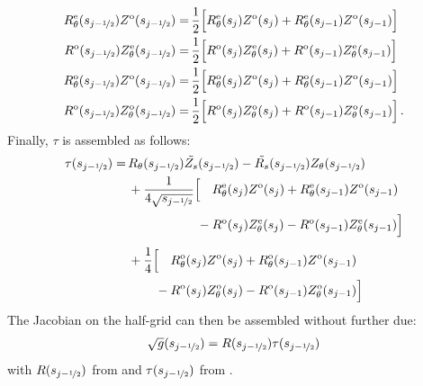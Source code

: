 \begin{align}
  R_\theta^\mathrm{e}(s_{j-\nicefrac{1}{2}}) Z^\mathrm{o}(s_{j-\nicefrac{1}{2}}) =&\, \frac{1}{2} \Bigl[ R_\theta^\mathrm{e}(s_{j}) Z^\mathrm{o}(s_{j}) + R_\theta^\mathrm{e}(s_{j-1}) Z^\mathrm{o}(s_{j-1}) \Bigr] \\
  R^\mathrm{o}(s_{j-\nicefrac{1}{2}}) Z_\theta^\mathrm{e}(s_{j-\nicefrac{1}{2}}) =&\, \frac{1}{2} \Bigl[ R^\mathrm{o}(s_{j}) Z_\theta^\mathrm{e}(s_{j}) + R^\mathrm{o}(s_{j-1}) Z_\theta^\mathrm{e}(s_{j-1}) \Bigr] \\
  R_\theta^\mathrm{o}(s_{j-\nicefrac{1}{2}}) Z^\mathrm{o}(s_{j-\nicefrac{1}{2}}) =&\, \frac{1}{2} \Bigl[ R_\theta^\mathrm{o}(s_{j}) Z^\mathrm{o}(s_{j}) + R_\theta^\mathrm{o}(s_{j-1}) Z^\mathrm{o}(s_{j-1}) \Bigr] \\
  R^\mathrm{o}(s_{j-\nicefrac{1}{2}}) Z_\theta^\mathrm{o}(s_{j-\nicefrac{1}{2}}) =&\, \frac{1}{2} \Bigl[ R^\mathrm{o}(s_{j}) Z_\theta^\mathrm{o}(s_{j}) + R^\mathrm{o}(s_{j-1}) Z_\theta^\mathrm{o}(s_{j-1}) \Bigr] \, .
\end{align}
Finally, $\tau$ is assembled as follows:
\begin{align}
  \tau(s_{j-\half}) =&\,   R_\theta(s_{j-\half}) {\tilde{Z_s}}(s_{j-\half}) - {\tilde{R_s}}(s_{j-\half}) Z_\theta(s_{j-\half}) \nonumber \\
                    ~&\, + \frac{1}{4 \sqrt{s_{j-\half}}} \Bigl[ \phantom{-}\, R_\theta^\mathrm{e}(s_{j}) Z^\mathrm{o}(s_{j}) + R_\theta^\mathrm{e}(s_{j-1}) Z^\mathrm{o}(s_{j-1}) \nonumber \\
           ~&\, \phantom{+ \frac{1}{4 \sqrt{s_{j-\half}}} \Bigl[}\,       -    R^\mathrm{o}(s_{j}) Z_\theta^\mathrm{e}(s_{j}) - R^\mathrm{o}(s_{j-1}) Z_\theta^\mathrm{e}(s_{j-1}) \Bigr] \nonumber \\
                    ~&\, + \frac{1}{4}                    \Bigl[ \phantom{-}\, R_\theta^\mathrm{o}(s_{j}) Z^\mathrm{o}(s_{j}) + R_\theta^\mathrm{o}(s_{j-1}) Z^\mathrm{o}(s_{j-1}) \nonumber \\
           ~&\, \phantom{+ \frac{1}{4}                    \Bigl[}\,       -    R^\mathrm{o}(s_{j}) Z_\theta^\mathrm{o}(s_{j}) - R^\mathrm{o}(s_{j-1}) Z_\theta^\mathrm{o}(s_{j-1}) \Bigr] \label{eqn:tau_final}
\end{align}
The Jacobian on the half-grid can then be assembled without further due:
\begin{equation}
  \sqrt{g}(s_{j-\nicefrac{1}{2}}) = R(s_{j-\nicefrac{1}{2}}) \tau(s_{j-\nicefrac{1}{2}})
\end{equation}
with $R(s_{j-\nicefrac{1}{2}})$ from  and $\tau(s_{j-\nicefrac{1}{2}})$ from .

